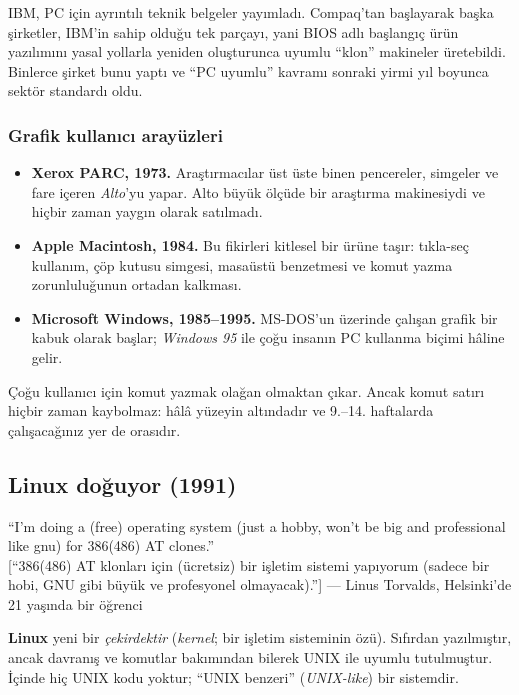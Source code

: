 \documentclass[11pt,a4paper]{article}
\newcommand{\term}[1]{\textbf{\color{mintdeep}#1}}
\begin{document}
IBM, PC için ayrıntılı teknik belgeler yayımladı. Compaq'tan başlayarak başka şirketler, IBM'in sahip olduğu tek parçayı, yani BIOS adlı başlangıç ürün yazılımını yasal yollarla yeniden oluşturunca uyumlu ``klon'' makineler üretebildi. Binlerce şirket bunu yaptı ve ``PC uyumlu'' kavramı sonraki yirmi yıl boyunca sektör standardı oldu.

\subsubsection{Grafik kullanıcı arayüzleri}
\begin{itemize}
  \item \textbf{Xerox PARC, 1973.} Araştırmacılar üst üste binen pencereler, simgeler ve fare içeren \emph{Alto}'yu yapar. Alto büyük ölçüde bir araştırma makinesiydi ve hiçbir zaman yaygın olarak satılmadı.
  \item \textbf{Apple Macintosh, 1984.} Bu fikirleri kitlesel bir ürüne taşır: tıkla-seç kullanım, çöp kutusu simgesi, masaüstü benzetmesi ve komut yazma zorunluluğunun ortadan kalkması.
  \item \textbf{Microsoft Windows, 1985--1995.} MS-DOS'un üzerinde çalışan grafik bir kabuk olarak başlar; \emph{Windows 95} ile çoğu insanın PC kullanma biçimi hâline gelir.
\end{itemize}

Çoğu kullanıcı için komut yazmak olağan olmaktan çıkar. Ancak komut satırı hiçbir zaman kaybolmaz: hâlâ yüzeyin altındadır ve 9.--14. haftalarda çalışacağınız yer de orasıdır.

\subsection{Linux doğuyor (1991)}

\begin{histnote}
``I'm doing a (free) operating system (just a hobby, won't be big and professional like gnu) for 386(486) AT clones.''\\
{\color{muted}[``386(486) AT klonları için (ücretsiz) bir işletim sistemi yapıyorum (sadece bir hobi, GNU gibi büyük ve profesyonel olmayacak).'']} \hfill --- Linus Torvalds, Helsinki'de 21 yaşında bir öğrenci
\end{histnote}

\term{Linux} yeni bir \emph{çekirdektir} (\emph{kernel}; bir işletim sisteminin özü). Sıfırdan yazılmıştır, ancak davranış ve komutlar bakımından bilerek UNIX ile uyumlu tutulmuştur. İçinde hiç UNIX kodu yoktur; ``UNIX benzeri'' (\emph{UNIX-like}) bir sistemdir.
\end{document}
